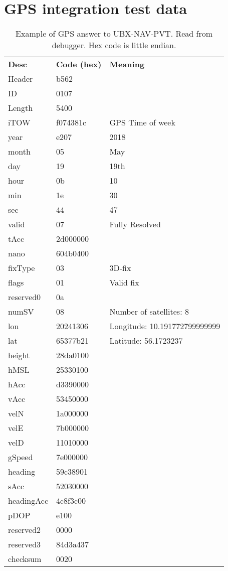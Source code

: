 \chapter{GPS integration test data}
\label{app:GPSinttest}

\begin{table}[H]
	\centering
	\setlength{\extrarowheight}{0pt}
	\begin{tabularx}{0.8\textwidth}{p{2cm} p{2cm} X}
		\oldtoprule
		\textbf{Desc} & \textbf{Code (hex)} & \textbf{Meaning} \\
		\oldmidrule
		Header & b562 & \\
		ID & 0107 & \\
		Length & 5400 & \\
		iTOW & f074381c & GPS Time of week \\
		year & e207 & 2018 \\
		month & 05 & May \\
		day & 19 & 19th \\
		hour & 0b & 10 \\
		min & 1e & 30 \\
		sec & 44 & 47 \\
		valid & 07 & Fully Resolved \\
		tAcc & 2d000000 & \\
		nano & 604b0400 & \\
		fixType & 03 & 3D-fix \\
		flags & 01 & Valid fix \\
		reserved0 & 0a & \\
		numSV & 08 & Number of satellites: 8 \\
		lon & 20241306 & Longitude: \num{10.191772799999999} \\
		lat & 65377b21 & Latitude: \num{56.1723237} \\
		height & 28da0100 & \\
		hMSL & 25330100 & \\
		hAcc & d3390000 & \\
		vAcc & 53450000 & \\
		velN & 1a000000 & \\
		velE & 7b000000 & \\
		velD & 11010000 & \\
		gSpeed & 7e000000 & \\
		heading & 59c38901 & \\
		sAcc & 52030000 & \\
		headingAcc & 4c8f3c00 & \\
		pDOP & e100 & \\
		reserved2 & 0000 & \\
		reserved3 & 84d3a437 & \\
		checksum & 0020 & \\
		\bottomrule
	\end{tabularx}
	\caption{Example of GPS answer to UBX-NAV-PVT\cite[p.~160-161]{NEO7_proto}. Read from debugger. Hex code is little endian.}
	\label{tab:GPSintdata}
\end{table}

